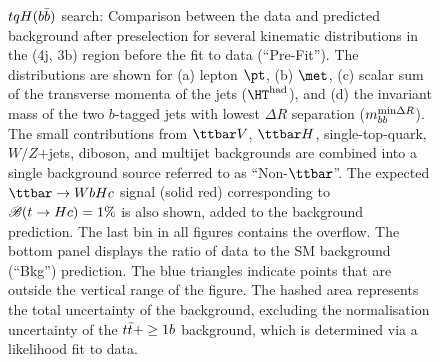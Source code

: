 \begin{figure}[htbp]
\begin{center}
\caption{\small{$tqH(b\bar{b})$ search: Comparison between the data and predicted background after preselection for several kinematic 
distributions in the (4j, 3b) region before the fit to data (``Pre-Fit''). 
The distributions are shown for (a) lepton $\pt$, (b) $\met$, (c) scalar sum of the transverse momenta of 
the jets ($\hthad$), and (d) the invariant mass of the two $b$-tagged jets with lowest 
$\Delta R$ separation ($m_{bb}^{\textrm{min}\Delta R}$).
The small contributions from $\ttbar V$, $\ttbar H$, single-top-quark, $W/Z$+jets, diboson, and multijet backgrounds are combined 
into a single background source referred to as ``Non-$\ttbar$''. 
The expected $\Hc$ signal (solid red) corresponding to $\mathscr{B}(t\to Hc)=1\%$ is also shown,
added to the background prediction.
The last bin in all figures contains the overflow.
The bottom panel displays the ratio of data to the SM background (``Bkg'') prediction. 
The blue triangles indicate points that are outside the vertical range of the figure. 
The hashed area represents the total uncertainty of the background, excluding the normalisation uncertainty of the $t\bar{t}+\geq1b$ background, 
which is determined via a likelihood fit to data.}}
\label{fig:Hbb_extravars_4j3b}
\end{center}
\end{figure}

